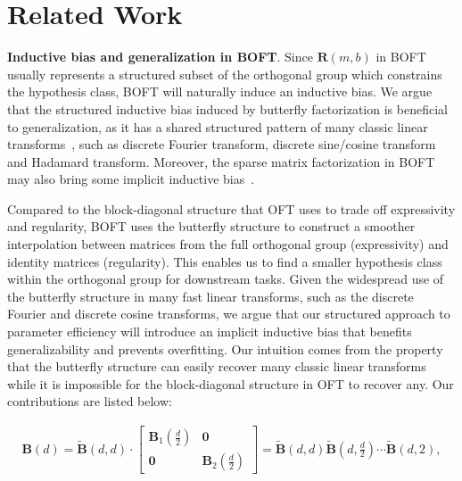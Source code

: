 \section{Related Work}

\textbf{Inductive bias and generalization in BOFT}. Since $\bm{R}(m,b)$ in BOFT usually represents a structured subset of the orthogonal group which constrains the hypothesis class, BOFT will naturally induce an inductive bias. We argue that the structured inductive bias induced by butterfly factorization is beneficial to generalization, as it has a shared structured pattern of many classic linear transforms~\cite{dao2019kaleidoscope}, such as discrete Fourier transform, discrete sine/cosine transform and Hadamard transform. Moreover, the sparse matrix factorization in BOFT may also bring some implicit inductive bias~\cite{gunasekar2017implicit,li2018algorithmic,liu2019neural}.

Compared to the block-diagonal structure that OFT uses to trade off expressivity and regularity, BOFT uses the butterfly structure to construct a smoother interpolation between matrices from the full orthogonal group (expressivity) and identity matrices (regularity). This enables us to find a smaller hypothesis class within the orthogonal group for downstream tasks. Given the widespread use of the butterfly structure in many fast linear transforms, such as the discrete Fourier and discrete cosine transforms, we argue that our structured approach to parameter efficiency will introduce an implicit inductive bias that benefits generalizability and prevents overfitting. Our intuition comes from the property that the butterfly structure can easily recover many classic linear transforms while it is impossible for the block-diagonal structure in OFT to recover any. Our contributions are listed below:

\begin{equation}
\begin{aligned}
    \!\!\bm{B}(d)=\tilde{\bm{B}}(d,d)\!\cdot\!\begin{bmatrix}
    \bm{B}_1(\frac{d}{2})\!\!\!\!\! & \bm{0} \\
    \bm{0}\!\!\!\!\! &\bm{B}_2(\frac{d}{2})
    \end{bmatrix}= \tilde{\bm{B}}(d,d)\tilde{\bm{B}}(d,\frac{d}{2})\cdots\tilde{\bm{B}}(d,2),
\end{aligned}
\end{equation}

